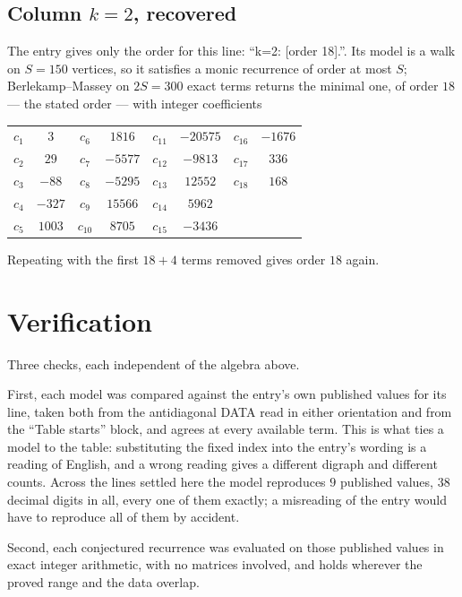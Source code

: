 \documentclass[11pt,a4paper]{article}
\theoremstyle{plain}
\theoremstyle{definition}
\begin{document}
\subsection*{Column $k=2$, recovered}
The entry gives only the order for this line: ``k=2: [order 18].''. Its model is a walk on
$S=150$ vertices, so it satisfies a monic recurrence of order at most $S$;
Berlekamp--Massey on $2S=300$ exact terms returns the minimal one, of order
$18$ --- the stated order --- with integer coefficients
\begin{center}\small\begin{tabular}{cccccccc}
$c_{1}$ & $3$ & $c_{6}$ & $1816$ & $c_{11}$ & $-20575$ & $c_{16}$ & $-1676$ \\
$c_{2}$ & $29$ & $c_{7}$ & $-5577$ & $c_{12}$ & $-9813$ & $c_{17}$ & $336$ \\
$c_{3}$ & $-88$ & $c_{8}$ & $-5295$ & $c_{13}$ & $12552$ & $c_{18}$ & $168$ \\
$c_{4}$ & $-327$ & $c_{9}$ & $15566$ & $c_{14}$ & $5962$ &  &  \\
$c_{5}$ & $1003$ & $c_{10}$ & $8705$ & $c_{15}$ & $-3436$ &  &  \\
\end{tabular}\end{center}
Repeating with the first $18+4$ terms removed gives order $18$ again.

\section{Verification}

Three checks, each independent of the algebra above.

First, each model was compared against the entry's own published values for its line, taken
both from the antidiagonal DATA read in either orientation and from the ``Table starts''
block, and agrees at every available term. This is what ties a model to the table:
substituting the fixed index into the entry's wording is a reading of English, and a wrong
reading gives a different digraph and different counts. Across the lines settled here the
model reproduces $9$ published values, $38$ decimal digits in all, every one of
them exactly; a misreading of the entry would have to reproduce all of them by accident.

Second, each conjectured recurrence was evaluated on those published values in exact
integer arithmetic, with no matrices involved, and holds wherever the proved range and the
data overlap.
\end{document}

